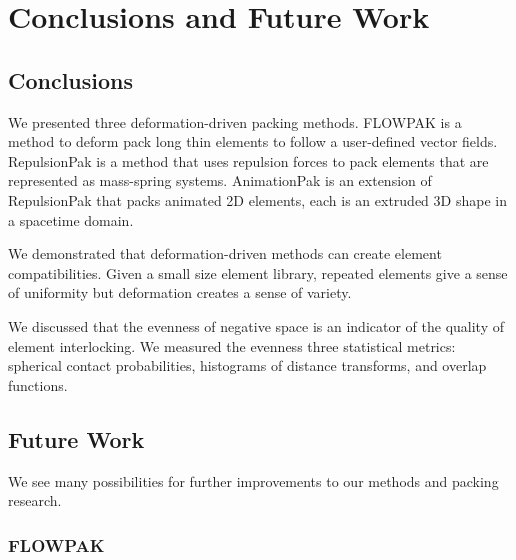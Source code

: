 
\chapter{Conclusions and Future Work}
\label{chapter_conclusions_and_future_work}

\section{Conclusions}

\newtext
{
We presented three deformation-driven packing methods.
FLOWPAK is a method to deform pack long thin elements
to follow a user-defined vector fields.
RepulsionPak is a method that uses repulsion forces to pack
elements that are represented as mass-spring systems.
AnimationPak is an extension of RepulsionPak that packs animated 2D elements,
each is an extruded 3D shape in a spacetime domain.
}

\newtext
{
We demonstrated that deformation-driven methods can create element compatibilities.
Given a small size element library, repeated elements
give a sense of uniformity but deformation creates a sense of variety.
}

\newtext
{
We discussed that the evenness of negative space is an indicator of the quality of element interlocking.
We measured the evenness three statistical metrics:
spherical contact probabilities, histograms of distance transforms, and overlap functions.
}

\section{Future Work}

\newtext
{
We see many possibilities for further improvements to our methods and packing research.
}

\subsection{FLOWPAK}


